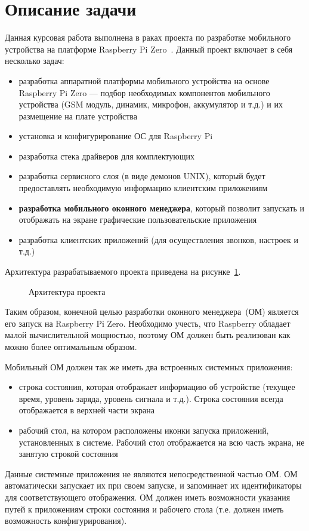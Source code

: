 \section{Описание задачи}
Данная курсовая работа выполнена в раках проекта по разработке мобильного устройства  на платформе Raspberry Pi Zero~\cite{RPiZero}. Данный проект включает в себя несколько задач:
\begin{itemize}
\item разработка аппаратной платформы мобильного устройства на основе Raspberry Pi Zero --- подбор необходимых компонентов мобильного устройства (GSM модуль, динамик, микрофон, аккумулятор и т.д.) и их размещение на плате устройства
\item установка и конфигурирование ОС для Raspberry Pi
\item разработка стека драйверов для комплектующих
\item разработка сервисного слоя (в виде демонов UNIX), который будет предоставлять необходимую информацию клиентским приложениям
\item \textbf{разработка мобильного оконного менеджера}, который позволит запускать и отображать на экране графические пользовательские приложения
\item разработка клиентских приложений (для осуществления звонков, настроек и т.д.)
\end{itemize}

Архитектура разрабатываемого проекта приведена на рисунке~\ref{fig:architecture}.
\begin{figure}[h!]
\caption{Архитектура проекта}
\label{fig:architecture}
\end{figure}

Таким образом, конечной целью разработки оконного менеджера~(ОМ) является его запуск на Raspberry Pi Zero. Необходимо учесть, что Raspberry обладает малой вычислительной мощностью, поэтому ОМ должен быть реализован как можно более оптимальным образом.

Мобильный ОМ должен так же иметь два встроенных системных приложения:
\begin{itemize}
\item строка состояния, которая отображает информацию об устройстве (текущее время, уровень заряда, уровень сигнала и т.д.). Строка состояния всегда отображается в верхней части экрана
\item рабочий стол, на котором расположены иконки запуска приложений, установленных в системе. Рабочий стол отображается на всю часть экрана, не занятую строкой состояния
\end{itemize}
Данные системные приложения не являются непосредственной частью ОМ. ОМ автоматически запускает их при своем запуске, и запоминает их идентификаторы для соответствующего отображения. ОМ должен иметь возможности указания путей к приложениям строки состояния и рабочего стола (т.е. должен иметь возможность конфигурирования).

